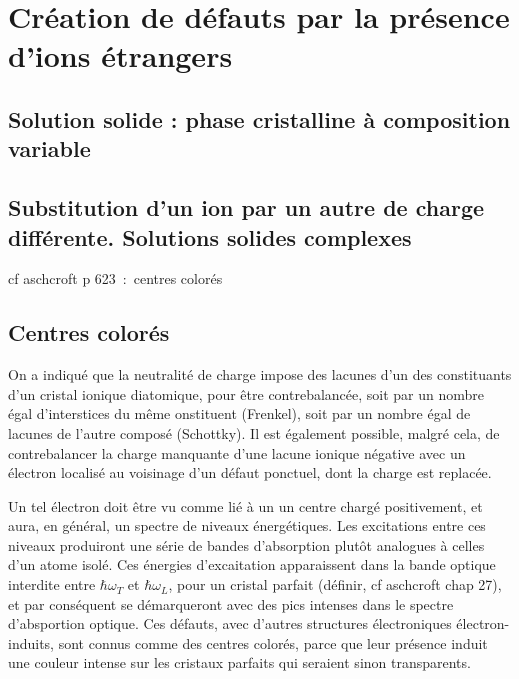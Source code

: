 \chapter{Création de défauts par la présence d'ions étrangers}

\section{Solution solide : phase cristalline à composition variable}


\section{Substitution d'un ion par un autre de charge différente. Solutions solides complexes}

cf aschcroft p 623 : centres colorés

\section{Centres colorés}

On a indiqué que la neutralité de charge impose des lacunes d'un des constituants d'un cristal ionique diatomique, pour être contrebalancée, soit par un nombre égal d'interstices du même onstituent (Frenkel), soit par un nombre égal de lacunes de l'autre composé (Schottky). Il est également possible, malgré cela, de contrebalancer la charge manquante d'une lacune ionique négative avec un électron localisé au voisinage d'un défaut ponctuel, dont la charge est replacée.

Un tel électron doit être vu comme lié à un un centre chargé positivement, et aura, en général, un spectre de niveaux énergétiques. Les excitations entre ces niveaux produiront une série de bandes d'absorption plutôt analogues à celles d'un atome isolé. Ces énergies d'excaitation apparaissent dans la bande optique interdite entre $\hbar\omega_T$ et $\hbar\omega_L$, pour un cristal parfait (définir, cf aschcroft chap 27), et par conséquent se démarqueront avec des pics intenses dans le spectre d'absportion optique. Ces défauts, avec d'autres structures électroniques électron-induits, sont connus comme des centres colorés, parce que leur présence induit une couleur intense sur les cristaux parfaits qui seraient sinon transparents.

